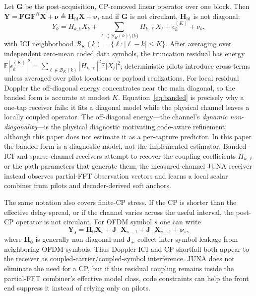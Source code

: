 \documentclass[journal]{IEEEtran}
\newcommand{\E}{\mathbb{E}}
\newcommand{\Ht}{^{H}}
\newcommand{\abs}[1]{\left\lvert #1 \right\rvert}
\newcommand{\juna}{JUNA}
\begin{document}
Let $\mathbf G$ be the post-acquisition, CP-removed linear operator over one
block. Then
$\mathbf Y=\mathbf F\mathbf G\mathbf F\Ht\mathbf X+\bm\nu\triangleq
\mathbf H_{\mathrm{fd}}\mathbf X+\bm\nu$, and if $\mathbf G$ is not circulant,
$\mathbf H_{\mathrm{fd}}$ is not diagonal:
\begin{equation}
  Y_k=H_{k,k}X_k+\!\!\sum_{\ell\in\mathcal B_K(k)\setminus\{k\}}\!\!H_{k,\ell}X_\ell
  +\epsilon_k^{(K)}+\nu_k,
  \label{eq:banded}
\end{equation}
with ICI neighborhood $\mathcal B_K(k)=\{\ell:\abs{\ell-k}\le K\}$. After
averaging over independent zero-mean coded data symbols, the truncation residual
has energy
$\E\abs{\epsilon_k^{(K)}}^2=\sum_{\ell\notin\mathcal B_K(k)}
\abs{H_{k,\ell}}^2\E\abs{X_\ell}^2$; deterministic pilots introduce cross-terms
unless averaged over pilot locations or payload realizations. For local residual
Doppler the off-diagonal energy concentrates near the main diagonal, so the
banded form is accurate at modest $K$. Equation~\eqref{eq:banded} is precisely
why a one-tap receiver
fails: it fits a diagonal model while the physical channel leaves a locally
coupled operator. The off-diagonal energy---the channel's \emph{dynamic
non-diagonality}---is the physical diagnostic motivating code-aware refinement,
although this paper does not estimate it as a per-capture predictor. In this
paper the banded form is a diagnostic model, not the
implemented estimator. Banded-ICI and sparse-channel receivers attempt to recover
the coupling coefficients $H_{k,\ell}$ or the path parameters that generate
them; the measured-channel \juna{} receiver instead observes partial-FFT
observation vectors and learns a local scalar combiner from pilots and decoder-derived soft
anchors.

The same notation also covers finite-CP stress. If the CP is shorter than the
effective delay spread, or if the channel varies across the useful interval, the
post-CP operator is not circulant. For OFDM symbol $s$ one can write
\begin{equation}
  \mathbf Y_s
  =\mathbf H_0\mathbf X_s
  +\mathbf J_{-}\mathbf X_{s-1}
  +\mathbf J_{+}\mathbf X_{s+1}
  +\bm\nu_s ,
  \label{eq:cp-short}
\end{equation}
where $\mathbf H_0$ is generally non-diagonal and $\mathbf J_{\pm}$ collect
inter-symbol leakage from neighboring OFDM symbols. Thus Doppler ICI and CP
shortfall both appear to the receiver as coupled-carrier/coupled-symbol
interference. \juna{} does not eliminate the need for a CP, but if this residual
coupling remains inside the partial-FFT combiner's effective model class, code
constraints can help the front end suppress it instead of relying only on pilots.
\end{document}
